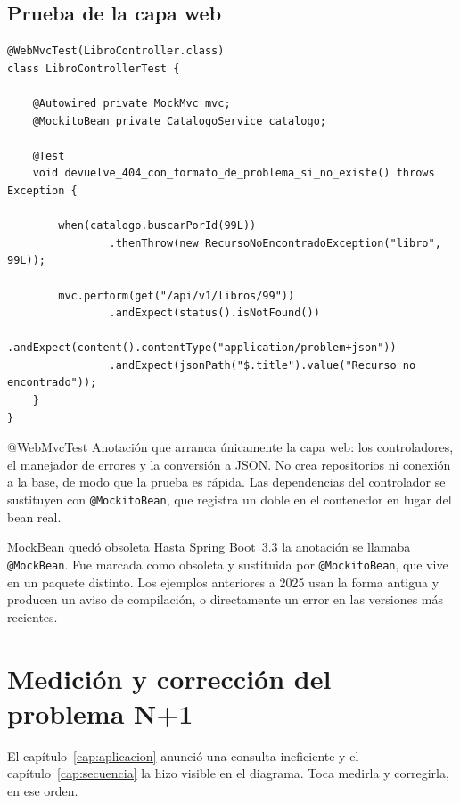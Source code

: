 \documentclass[11pt,a4paper,openany]{book}
\begin{document}
\subsection{Prueba de la capa web}
\label{sec:prueba-web}

\begin{lstlisting}[style=java,caption={Prueba de integracion del controlador con MockMvc.},label={lst:prueba-web}]
@WebMvcTest(LibroController.class)
class LibroControllerTest {

	@Autowired private MockMvc mvc;
	@MockitoBean private CatalogoService catalogo;

	@Test
	void devuelve_404_con_formato_de_problema_si_no_existe() throws Exception {

		when(catalogo.buscarPorId(99L))
				.thenThrow(new RecursoNoEncontradoException("libro", 99L));

		mvc.perform(get("/api/v1/libros/99"))
				.andExpect(status().isNotFound())
				.andExpect(content().contentType("application/problem+json"))
				.andExpect(jsonPath("$.title").value("Recurso no encontrado"));
	}
}
\end{lstlisting}

\begin{cajadefinicion}{@WebMvcTest}
	Anotación que arranca únicamente la capa web: los controladores, el manejador de errores y la conversión a JSON. No crea repositorios ni conexión a la base, de modo que la prueba es rápida. Las dependencias del controlador se sustituyen con \texttt{@MockitoBean}, que registra un doble en el contenedor en lugar del bean real.
\end{cajadefinicion}

\begin{cajaadvertencia}{MockBean quedó obsoleta}
	Hasta Spring Boot~3.3 la anotación se llamaba \texttt{@MockBean}. Fue marcada como obsoleta y sustituida por \texttt{@MockitoBean}, que vive en un paquete distinto. Los ejemplos anteriores a 2025 usan la forma antigua y producen un aviso de compilación, o directamente un error en las versiones más recientes.
\end{cajaadvertencia}

\section{Medición y corrección del problema N+1}
\label{sec:n1}

El capítulo~\ref{cap:aplicacion} anunció una consulta ineficiente y el capítulo~\ref{cap:secuencia} la hizo visible en el diagrama. Toca medirla y corregirla, en ese orden.
\end{document}
